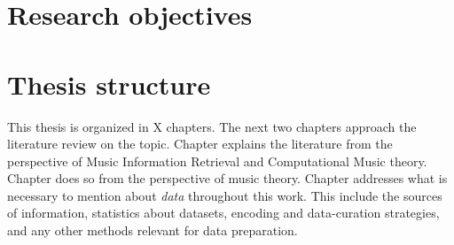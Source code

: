 \section{Research objectives}


\section{Thesis structure}
This thesis is organized in X chapters. 
The next two chapters approach the literature review on the topic.
Chapter  explains the literature from the perspective of Music Information Retrieval and Computational Music theory.
Chapter  does so from the perspective of music theory.
Chapter  addresses what is necessary to mention about \emph{data} throughout this work.
This include the sources of information, statistics about datasets, encoding and data-curation strategies, and any other methods relevant for data preparation.




